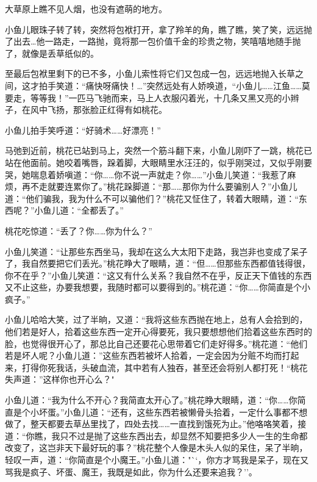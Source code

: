 \documentclass[12pt,oneside]{book}
\begin{document}
大草原上瞧不见人烟，也没有遮萌的地方。

小鱼儿眼珠子转了转，突然将包袱打开，拿了羚羊的角，瞧了瞧，笑了笑，远远抛了出去\ldots 他一路走，一路抛，竟将那一包价值千金的珍贵之物，笑嘻嘻地随手抛了，就像是丢草纸似的。

至最后包袱里剩下的已不多，小鱼儿索性将它们又包成一包，远远地抛入长草之间，这才拍手笑道：``痛快呀痛快！\ldots{}''突然远处有人娇唤道，``小鱼儿\ldots\ldots 江鱼\ldots\ldots 莫要走，等等我！''一匹马飞驰而来，马上人衣服闪着光，十几条又黑又亮的小辫子，在风中飞扬，那张脸正红得有如桃花。

小鱼儿拍手笑呼道：``好骑术\ldots\ldots 好漂亮！''

马弛到近前，桃花已站到马上，突然一个筋斗翻下来，小鱼儿刚吓了一跳，桃花已站在他面前。她咬着嘴唇，跺着脚，大眼睛里水汪汪的，似乎刚哭过，又似乎刚要哭，她喘息着娇嗔道：``你\ldots\ldots 你不说一声就走？你\ldots\ldots{}''小鱼儿笑道：``我惹了麻烦，再不走就要连累你了。''桃花跺脚道：``那\ldots\ldots 那你为什么要骗别人？''小鱼儿道：``他们骗我，我为什么不可以骗他们？''桃花又怔住了，转着大眼睛，道：``东西呢？''小鱼儿道：``全都丢了。''

桃花吃惊道：``丢了？你\ldots\ldots 你为什么？''

小鱼儿笑道：``让那些东西坐马，我却在这么大太阳下走路，我岂非也变成了呆子了，我自然要把它们丢光。''桃花睁大了眼睛，道：``但\ldots\ldots 但那些东西都值钱得很，你不在乎？''小鱼儿笑道：``这又有什么关系？我自然不在乎，反正天下值钱的东西又不止这些，办要我想要，我随时都可以要得到的。''桃花道：``你\ldots\ldots 你简直是个小疯子。''

小鱼儿哈哈大笑，过了半晌，又道：``我将这些东西抛在地上，总有人会拾到的，他们若是好人，拾着这些东西一定开心得要死，我只要想想他们拾着这些东西时的脸，也觉得很开心了，那总比自己还要花心思带着它们走好得多。''桃花道：``他们若是坏人呢？小鱼儿道：''这些东西若被坏人拾着，一定会因为分赃不均而打起来，打得你死我话，头破血流，其中若有人独吞，甚至还会将别人都打死！``桃花失声道：''这样你也开心么？"

小鱼儿道：``我为什么不开心？我简直太开心了。''桃花睁大眼睛，道：``你\ldots\ldots 你简直是个小坏蛋。''小鱼儿道：``还有，这些东西若被懒骨头拾着，一定什么事都不想做了，整天都要去草丛里找了，四处去找\ldots\ldots 一直找到饿死为止。''他咯咯笑着，接道：``你瞧，我只不过是抛了这些东西出去，却显然不知要把多少人一生的生命都改变了，这岂非天下最好玩的事？''桃花整个人像是木头人似的呆住，呆了半晌，轻叹一声，道：``你简直是个小魔王。''小鱼儿道："``，你方才骂我是呆子，现在又骂我是疯子、坏蛋、魔王，我既是如此，你为什么还要来追我？''。
\end{document}
